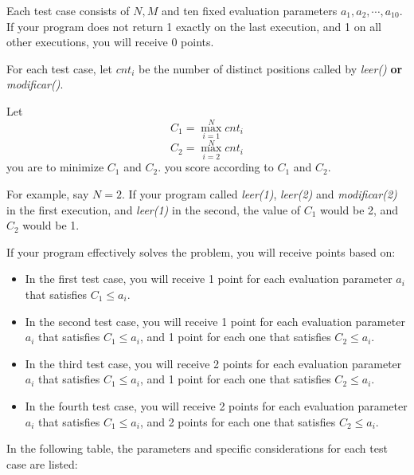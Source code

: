 \documentclass[12pt]{scrartcl}
\begin{document}
        Each test case consists of $N, M$ and ten fixed evaluation parameters $a_1, a_2, \cdots, a_{10}$. If your program does not return 1 exactly on the last execution, and 1 on all other executions, you will receive 0 points.\newline

        For each test case, let $cnt_i$ be the number of distinct positions called by {\itshape leer()} \textbf{or} {\itshape modificar()}.

        Let \begin{equation}
            C_1 = \max^N_{i=1} cnt_i 
        \end{equation} 
        \begin{equation}
            C_2 = \max^N_{i=2} cnt_i 
        \end{equation}
        you are to minimize $C_1$ and $C_2$. you score according to $C_1$ and $C_2$.
        \newline


        For example, say $N = 2$. If your program called \textit{leer(1)}, \textit{leer(2)} and \textit{modificar(2)} in the first execution, and \textit{leer(1)} in the second, the value of $C_1$ would be 2, and $C_2$ would be 1.
        
        If your program effectively solves the problem, you will receive points based on:
        
        
        \begin{itemize}
            \item In the first test case, you will receive 1 point for each evaluation parameter $a_i$ that satisfies $C_1 \le a_i$.
            \item In the second test case, you will receive 1 point for each evaluation parameter $a_i$ that satisfies $C_1 \le a_i$, and 1 point for each one that satisfies $C_2 \le a_i$.
            \item In the third test case, you will receive 2 points for each evaluation parameter $a_i$ that satisfies $C_1 \le a_i$, and 1 point for each one that satisfies $C_2 \le a_i$.
            \item In the fourth test case, you will receive 2 points for each evaluation parameter $a_i$ that satisfies $C_1 \le a_i$, and 2 points for each one that satisfies $C_2 \le a_i$.
            
        \end{itemize}


        In the following table, the parameters and specific considerations for each test case are listed:
        
\end{document}

